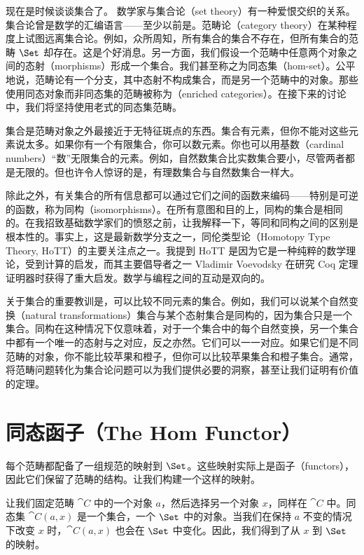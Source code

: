 
\lettrine[lhang=0.17]{现}{在是时候}谈谈集合了。
数学家与集合论（set theory）有一种爱恨交织的关系。集合论曾是数学的汇编语言——至少以前是。范畴论（category theory）在某种程度上试图远离集合论。例如，众所周知，所有集合的集合不存在，但所有集合的范畴 $\Set$ 却存在。这是个好消息。另一方面，我们假设一个范畴中任意两个对象之间的态射（morphisms）形成一个集合。我们甚至称之为同态集（hom-set）。公平地说，范畴论有一个分支，其中态射不构成集合，而是另一个范畴中的对象。那些使用同态对象而非同态集的范畴被称为（enriched categories）。在接下来的讨论中，我们将坚持使用老式的同态集范畴。

集合是范畴对象之外最接近于无特征斑点的东西。集合有元素，但你不能对这些元素说太多。如果你有一个有限集合，你可以数元素。你也可以用基数（cardinal numbers）“数”无限集合的元素。例如，自然数集合比实数集合要小，尽管两者都是无限的。但也许令人惊讶的是，有理数集合与自然数集合一样大。

除此之外，有关集合的所有信息都可以通过它们之间的函数来编码——特别是可逆的函数，称为同构（isomorphisms）。在所有意图和目的上，同构的集合是相同的。在我招致基础数学家们的愤怒之前，让我解释一下，等同和同构之间的区别是根本性的。事实上，这是最新数学分支之一，同伦类型论（Homotopy Type Theory, HoTT）的主要关注点之一。我提到 HoTT 是因为它是一种纯粹的数学理论，受到计算的启发，而其主要倡导者之一 Vladimir Voevodsky 在研究 Coq 定理证明器时获得了重大启发。数学与编程之间的互动是双向的。

关于集合的重要教训是，可以比较不同元素的集合。例如，我们可以说某个自然变换（natural transformations）集合与某个态射集合是同构的，因为集合只是一个集合。同构在这种情况下仅意味着，对于一个集合中的每个自然变换，另一个集合中都有一个唯一的态射与之对应，反之亦然。它们可以一一对应。如果它们是不同范畴的对象，你不能比较苹果和橙子，但你可以比较苹果集合和橙子集合。通常，将范畴问题转化为集合论问题可以为我们提供必要的洞察，甚至让我们证明有价值的定理。

\section{同态函子（The Hom Functor）}

每个范畴都配备了一组规范的映射到 $\Set$。这些映射实际上是函子（functors），因此它们保留了范畴的结构。让我们构建一个这样的映射。

让我们固定范畴 $\cat{C}$ 中的一个对象 $a$，然后选择另一个对象 $x$，同样在 $\cat{C}$ 中。同态集 $\cat{C}(a, x)$ 是一个集合，一个 $\Set$ 中的对象。当我们在保持 $a$ 不变的情况下改变 $x$ 时，$\cat{C}(a, x)$ 也会在 $\Set$ 中变化。因此，我们得到了从 $x$ 到 $\Set$ 的映射。

